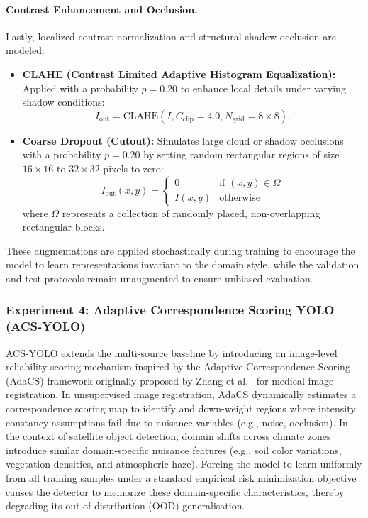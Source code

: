 \documentclass[12pt,a4paper]{article}
\begin{document}
\paragraph{Contrast Enhancement and Occlusion.}
Lastly, localized contrast normalization and structural shadow occlusion are modeled:
\begin{itemize}[leftmargin=*]
    \item \textbf{CLAHE (Contrast Limited Adaptive Histogram Equalization):} Applied with a probability $p = 0.20$ to enhance local details under varying shadow conditions:
    \begin{equation}
        I_{\text{out}} = \text{CLAHE}(I, C_{\text{clip}} = 4.0, N_{\text{grid}} = 8 \times 8).
    \end{equation}
    
    \item \textbf{Coarse Dropout (Cutout):} Simulates large cloud or shadow occlusions with a probability $p = 0.20$ by setting random rectangular regions of size $16\times16$ to $32\times32$ pixels to zero:
    \begin{equation}
        I_{\text{out}}(x, y) = \begin{cases} 0 & \text{if } (x, y) \in \Omega \\ I(x, y) & \text{otherwise} \end{cases}
    \end{equation}
    where $\Omega$ represents a collection of randomly placed, non-overlapping rectangular blocks.
\end{itemize}

These augmentations are applied stochastically during training to encourage the model to learn representations invariant to the domain style, while the validation and test protocols remain unaugmented to ensure unbiased evaluation.




\subsubsection{Experiment 4: Adaptive Correspondence Scoring YOLO (ACS-YOLO)}
\label{subsubsec:acs_yolo}

ACS-YOLO extends the multi-source baseline by introducing an image-level reliability scoring mechanism inspired by the Adaptive Correspondence Scoring (AdaCS) framework originally proposed by Zhang et al.~\cite{zhang2023adacs} for medical image registration. In unsupervised image registration, AdaCS dynamically estimates a correspondence scoring map to identify and down-weight regions where intensity constancy assumptions fail due to nuisance variables (e.g., noise, occlusion). In the context of satellite object detection, domain shifts across climate zones introduce similar domain-specific nuisance features (e.g., soil color variations, vegetation densities, and atmospheric haze). Forcing the model to learn uniformly from all training samples under a standard empirical risk minimization objective causes the detector to memorize these domain-specific characteristics, thereby degrading its out-of-distribution (OOD) generalisation.
\end{document}
